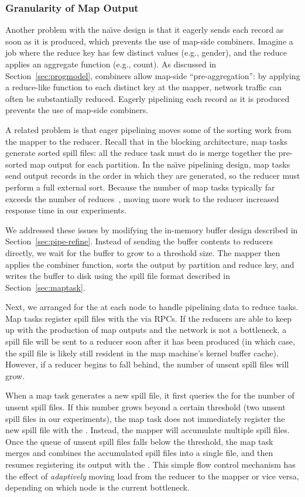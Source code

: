 \subsubsection{Granularity of Map Output}
\label{sec:mapout}

Another problem with the na\"{\i}ve design is that it eagerly sends
each record as soon as it is produced, which prevents the use of
map-side combiners. Imagine a job where the reduce key has few
distinct values (e.g., gender), and the reduce applies an aggregate
function (e.g., count). As discussed in Section~\ref{sec:progmodel},
combiners allow map-side ``pre-aggregation'': by applying a
reduce-like function to each distinct key at the mapper, network
traffic can often be substantially reduced. Eagerly pipelining each
record as it is produced prevents the use of map-side combiners.

A related problem is that eager pipelining moves some of the sorting
work from the mapper to the reducer. Recall that in the blocking
architecture, map tasks generate sorted spill files: all the reduce
task must do is merge together the pre-sorted map output for each
partition. In the na\"{\i}ve pipelining design, map tasks send output
records in the order in which they are generated, so the reducer must
perform a full external sort. Because the number of map tasks
typically far exceeds the number of reduces~\cite{mapreduce-osdi},
moving more work to the reducer increased response time in our
experiments.

We addressed these issues by modifying the in-memory buffer design described in
Section~\ref{sec:pipe-refine}. Instead of sending the buffer contents to
reducers directly, we wait for the buffer to grow to a threshold
size. The mapper then applies the combiner function, sorts the output by
partition and reduce key, and writes the buffer to disk using the spill file
format described in Section~\ref{sec:maptask}.

Next, we arranged for the {\TT} at each node to handle pipelining data to reduce
tasks. Map tasks register spill files with the {\TT} via RPCs. If the reducers
are able to keep up with the production of map outputs and the network is not a
bottleneck, a spill file will be sent to a reducer soon after it has been
produced (in which case, the spill file is likely still resident in the map
machine's kernel buffer cache). However, if a reducer begins to fall behind, the
number of unsent spill files will grow.

When a map task generates a new spill file, it first queries the {\TT} for the
number of unsent spill files. If this number grows beyond a certain threshold
(two unsent spill files in our experiments), the map task does not immediately
register the new spill file with the {\TT}. Instead, the mapper will accumulate
multiple spill files. Once the queue of unsent spill files falls below the
threshold, the map task merges and combines the accumulated spill files into a
single file, and then resumes registering its output with the {\TT}. This simple
flow control mechanism has the effect of \emph{adaptively} moving load from the
reducer to the mapper or vice versa, depending on which node is the current
bottleneck.

